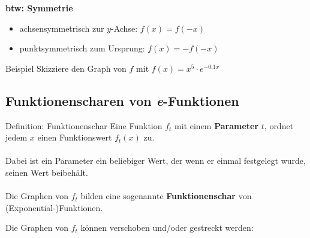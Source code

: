 \documentclass{article}
\begin{document}
\textbf{btw: Symmetrie}
\begin{itemize}
    \item achsensymmetrisch zur $y$-Achse: $f(x)=f(-x)$
    \item punktsymmetrisch zum Ursprung: $f(x)=-f(-x)$
\end{itemize}

\begin{boxx}[DarkBlue]{Beispiel}
    Skizziere den Graph von $f$ mit $f(x)= x^5\cdot e^{-0.1x}$
    \begin{figure}[H]
        \centering
        \end{figure}
\end{boxx}

\newpage

\subsection{Funktionenscharen von \emph{e}-Funktionen}
\begin{boxx}[Red]{Definition: Funktionenschar}
    Eine Funktion $f_t$ mit einem \textbf{Parameter} $t$,
    ordnet jedem $x$ einen Funktionswert $f_t(x)$ zu.
    \\\\
    Dabei ist ein Parameter ein beliebiger Wert, der wenn er einmal festgelegt wurde,
    seinen Wert beibehält.
    \\\\
    Die Graphen von $f_t$ bilden eine sogenannte \textbf{Funktionenschar} von (Exponential-)Funktionen.
\end{boxx}


Die Graphen von $f_t$ können verschoben und/oder gestreckt werden:
\end{document}
